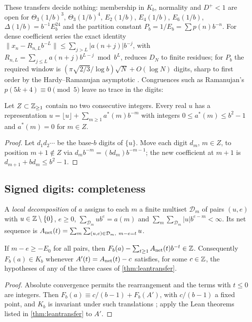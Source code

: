 \documentclass[11pt]{article}
\newcommand{\dist}[1]{\lVert #1\rVert}
\newcommand{\fr}[1]{\{#1\}}
\begin{document}
These transfers decide nothing: membership in $K_b$, normality and $D^+<1$ are open for
$\Theta_3(1/b)^3$, $\Theta_3(1/b)^4$, $E_2(1/b)$, $E_4(1/b)$, $E_6(1/b)$, $\Delta(1/b)=b^{-1}E_b^{24}$ and
the partition constant $P_b=1/E_b=\sum p(n)b^{-n}$. For dense coefficient series the exact identity
$\dist{x_n-R_{n,L}b^{-L}}\le\sum_{j>L}|a(n+j)|b^{-j}$, with
$R_{n,L}=\sum_{j\le L}a(n+j)b^{L-j}\bmod b^L$, reduces $D_N$ to finite residues; for $P_b$ the required
window is $(\pi\sqrt{2/3}/\log b)\sqrt N+O(\log N)$ digits, sharp to first order by the
Hardy--Ramanujan asymptotic \cite{HardyRamanujan1918}. Congruences such as Ramanujan's
$p(5k+4)\equiv0\pmod5$ leave no trace in the digits:

\begin{proposition}\label{prop:washout}
Let $Z\subset\mathbb Z_{\ge1}$ contain no two consecutive integers. Every real $u$ has a representation
$u=\lfloor u\rfloor+\sum_{m\ge1}a^*(m)b^{-m}$ with integers $0\le a^*(m)\le b^2-1$ and $a^*(m)=0$ for
$m\in Z$.
\end{proposition}

\begin{proof}
Let $d_1d_2\cdots$ be the base-$b$ digits of $\fr u$. Move each digit $d_m$, $m\in Z$, to position
$m+1\notin Z$ via $d_mb^{-m}=(bd_m)b^{-m-1}$; the new coefficient at $m+1$ is
$d_{m+1}+bd_m\le b^2-1$.
\end{proof}

\subsection{Signed digits: completeness}\label{subsec:completeness}

A \emph{local decomposition} of $a$ assigns to each $m$ a finite multiset $\mathcal D_m$ of pairs
$(u,e)$ with $u\in\mathbb Z\setminus\{0\}$, $e\ge0$, $\sum_{\mathcal D_m}ub^e=a(m)$ and
$\sum_m\sum_{\mathcal D_m}|u|b^{e-m}<\infty$. Its net sequence is
$A_{\rm net}(t)=\sum_m\sum_{(u,e)\in\mathcal D_m,\ m-e=t}u$.

\begin{theorem}\label{thm:net}
If $m-e\ge-E_0$ for all pairs, then $F_b(a)-\sum_{t\ge1}A_{\rm net}(t)b^{-t}\in\mathbb Z$. Consequently
$F_b(a)\in K_b$ whenever $A'(t)=A_{\rm net}(t)-c$ satisfies, for some $c\in\mathbb Z$, the hypotheses of
any of the three cases of \cref{thm:leantransfer}.
\end{theorem}

\begin{proof}
Absolute convergence permits the rearrangement and the terms with $t\le0$ are integers. Then
$F_b(a)\equiv c/(b-1)+F_b(A')$, with $c/(b-1)$ a fixed point, and $K_b$ is invariant under such
translations \cite{DiscrepancyCompanion}; apply the Lean theorems listed in
\cref{thm:leantransfer} to $A'$.
\end{proof}
\end{document}

